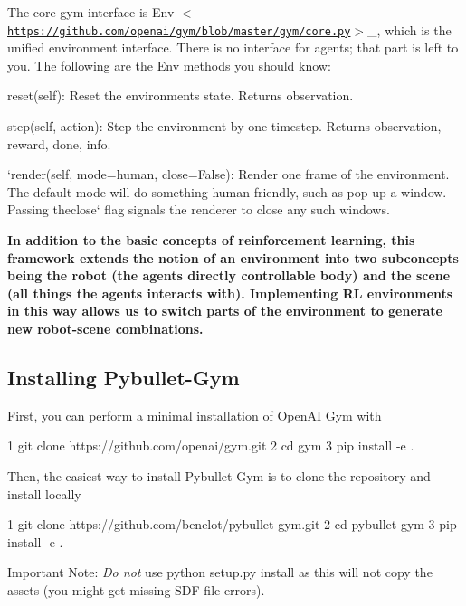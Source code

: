 The core {\ttfamily gym} interface is {\ttfamily Env $<$\href{https://github.com/openai/gym/blob/master/gym/core.py}{\tt https\+://github.\+com/openai/gym/blob/master/gym/core.\+py}$>$}\+\_\+, which is the unified environment interface. There is no interface for agents; that part is left to you. The following are the {\ttfamily Env} methods you should know\+:


\begin{DoxyItemize}
\item {\ttfamily reset(self)}\+: Reset the environment\textquotesingle{}s state. Returns {\ttfamily observation}.
\item {\ttfamily step(self, action)}\+: Step the environment by one timestep. Returns {\ttfamily observation}, {\ttfamily reward}, {\ttfamily done}, {\ttfamily info}.
\item `render(self, mode=\textquotesingle{}human\textquotesingle{}, close=False){\ttfamily \+: Render one frame of the environment. The default mode will do something human friendly, such as pop up a window. Passing the}close` flag signals the renderer to close any such windows.
\end{DoxyItemize}

{\bfseries In addition to the basic concepts of reinforcement learning, this framework extends the notion of an environment into two subconcepts being the robot (the agents directly controllable body) and the scene (all things the agents interacts with). Implementing RL environments in this way allows us to switch parts of the environment to generate new robot-\/scene combinations.}

\subsection*{Installing Pybullet-\/\+Gym}

First, you can perform a minimal installation of Open\+AI Gym with 
\begin{DoxyCode}
1 git clone https://github.com/openai/gym.git
2 cd gym
3 pip install -e .
\end{DoxyCode}


Then, the easiest way to install Pybullet-\/\+Gym is to clone the repository and install locally 
\begin{DoxyCode}
1 git clone https://github.com/benelot/pybullet-gym.git
2 cd pybullet-gym
3 pip install -e .
\end{DoxyCode}


Important Note\+: {\itshape Do not} use {\ttfamily python setup.\+py install} as this will not copy the assets (you might get missing S\+DF file errors).

